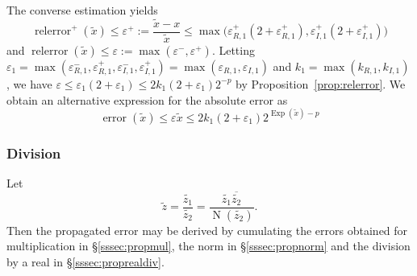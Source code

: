 \documentclass [12pt]{article}
\newcommand {\corr}[1]{{#1}}
\newcommand {\appro}[1]{\widetilde {#1}}
\DeclareMathOperator{\Exp}{\operatorname {Exp}}
\newcommand{\error}{\operatorname {error}}
\newcommand{\relerror}{\operatorname {relerror}}
\newcommand{\Norm}{\operatorname {N}}
\renewcommand {\epsilon}{\varepsilon}
\renewcommand {\leq}{\leqslant}
\begin{document}
The converse estimation yields
\begin {equation}
\label {eq:propnormepsplus}
\relerror^+ (\appro x)
\leq
\epsilon^+
:=
\frac {\appro x - \corr x}{\appro x}
\leq
\max \big(
   \epsilon_{R, 1}^+ (2 + \epsilon_{R, 1}^+),
   \epsilon_{I, 1}^+ (2 + \epsilon_{I, 1}^+)
\big)
\end {equation}
and $\relerror (\appro x) \leq \epsilon := \max (\epsilon^-, \epsilon^+)$.
Letting
$\epsilon_1 = \max ( \epsilon_{R, 1}^-, \epsilon_{R, 1}^+,
                     \epsilon_{I, 1}^-, \epsilon_{I, 1}^+ )
            = \max ( \epsilon_{R, 1},   \epsilon_{I, 1} )$
and $k_1 = \max ( k_{R, 1}, k_{I, 1})$,
we have
$\epsilon \leq \epsilon_1 (2 + \epsilon_1) \leq 2 k_1 (2 + \epsilon_1) 2^{-p}$
by Proposition~\ref {prop:relerror}.
We obtain an alternative expression for the absolute error as
\begin {equation}
\label {eq:propnormalt}
\error (\appro x) \leq \epsilon \appro x
\leq
2 k_1 (2 + \epsilon_1) 2^{\Exp (\appro x) - p}
\end {equation}


\subsubsection {Division}
\label{sssec:propdiv}

Let
\[
\appro z = \frac {\appro {z_1}}{\appro {z_2}}
= \frac {\appro {z_1} \overline {\appro {z_2}}}{\Norm (\appro {z_2})}.
\]
Then the propagated error may be derived by cumulating the errors obtained
for multiplication in \S\ref {sssec:propmul}, the norm in
\S\ref {sssec:propnorm} and the division by a real in
\S\ref {sssec:proprealdiv}.
\end{document}
